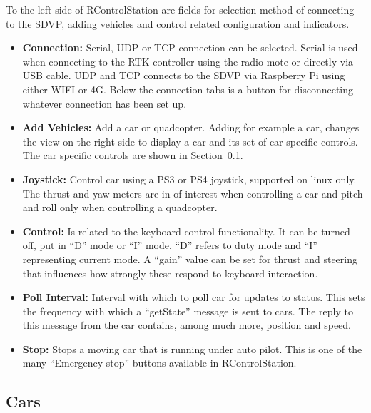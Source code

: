 \documentclass[12pt]{article} %
\begin{document}
\begin{minipage}{0.2\textwidth}
\end{minipage}
\begin{minipage}{0.7\textwidth}
  To the left side of RControlStation are fields for selection method of connecting to the
  SDVP, adding vehicles and control related configuration and indicators.  
  \begin{itemize}
  \item {\bf Connection:} Serial, UDP or TCP connection can be
    selected. Serial is used when connecting to the RTK controller
    using the radio mote or directly via USB cable. UDP and TCP
    connects to the SDVP via Raspberry Pi using either WIFI or 4G.
    Below the connection tabs is a button for disconnecting whatever
    connection has been set up. 
  \item {\bf Add Vehicles:} Add a car or quadcopter. Adding for
    example a car, changes the view on the right side to display a car
    and its set of car specific controls. The car specific controls are
    shown in Section~\ref{sec:cars}. %
  \item {\bf Joystick:} Control car using a PS3 or PS4 joystick, supported on linux only.
    The thrust and yaw meters are in of interest when controlling a car and pitch and roll
    only when controlling a quadcopter.
  \item {\bf Control:} Is related to the keyboard control
    functionality. It can be turned off, put in ``D'' mode or ``I''
    mode. ``D'' refers to duty mode and ``I'' representing current
    mode.  A ``gain'' value can be set for thrust and steering that
    influences how strongly these respond to keyboard interaction.
  \item {\bf Poll Interval:} Interval with which to poll car for updates to status.
    This sets the frequency with which a ``getState'' message is sent to cars. The reply to
    this message from the car contains, among much more, position and speed. 
  \item {\bf Stop:} Stops a moving car that is running under auto pilot. This
    is one of the many ``Emergency stop'' buttons available in RControlStation. 
  \end{itemize} 
\end{minipage}


\subsection{Cars}
\label{sec:cars}
\end{document}
